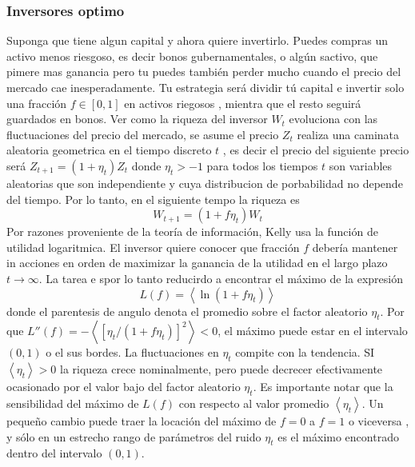 \documentclass[12pt,a4paper]{article}
\begin{document}
\subsubsection*{Inversores optimo}
\quad Suponga que tiene algun capital y ahora quiere invertirlo. Puedes compras un activo menos riesgoso, es decir bonos gubernamentales, o algún sactivo, que pimere mas ganancia pero tu puedes también perder mucho cuando el precio del mercado cae inesperadamente. Tu estrategia será dividir tú capital e invertir solo una fracción $f\in [0,1]$ en activos riegosos , mientra que el resto seguirá guardados en bonos. Ver como la riqueza del inversor $W_t$ evoluciona con las fluctuaciones del precio del mercado, se asume el precio $Z_t$ realiza una caminata aleatoria geometrica en el tiempo discreto $t$ , es decir el precio del siguiente precio será $Z_{t+1}= (1+\eta_t)Z_t$ donde $\eta_t > -1$ para todos los tiempos $t$ son variables aleatorias que son independiente y cuya distribucion de porbabilidad no depende del tiempo. Por lo tanto, en el siguiente tempo la riqueza es 
\begin{equation}
W_{t+1} = (1+f\eta_t)W_t
\end{equation}
Por razones proveniente de la teoría de información, Kelly usa la función de utilidad logaritmica. El inversor quiere conocer que fracción $f$ debería mantener in acciones en orden de maximizar la ganancia de la utilidad en el largo plazo $t\rightarrow \infty$. La tarea e spor lo tanto reducirdo a encontrar el máximo de la expresión
\begin{equation}
L(f) = \left< \ln (1+f\eta_t)\right>
\end{equation}
donde el parentesis de angulo denota el promedio sobre el factor aleatorio $\eta_t$. Por que $L''(f)= -\left< [\eta_t/(1+f\eta_t)]^2\right><0$, el máximo puede estar en el intervalo $(0,1)$ o el sus bordes. La fluctuaciones en $\eta_t$ compite con la tendencia. SI $\left<\eta_t\right>>0$ la riqueza crece nominalmente, pero puede decrecer efectivamente ocasionado por el valor bajo del factor aleatorio $\eta_t$. Es importante notar que la sensibilidad del máximo de $L(f)$ con respecto al valor promedio $\left<\eta_t\right>$. Un pequeño cambio puede traer la locación del máximo de $f=0$ a $f=1$ o viceversa , y sólo en un estrecho rango de parámetros del ruido $\eta_t$ es el máximo encontrado dentro del intervalo $(0,1)$.
\end{document}
